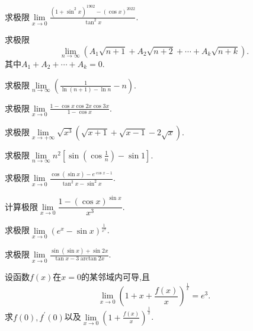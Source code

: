 \documentclass[UTF8,a4paper]{ctexart}
\begin{document}
\begin{example}[西北大学,2023]
	求极限$\lim\limits_{x\to 0}\frac{(1+\sin^2 x)^{1902}-(\cos x)^{2022}}{\tan^2 x}$.
\end{example}
\begin{example}[华南师范大学,2023]
	求极限
	\begin{equation*}
		\lim\limits_{n\to\infty}\left(A_1\sqrt{n+1}+A_2\sqrt{n+2}+\cdots+A_k\sqrt{n+k}\right).
	\end{equation*}
其中$A_1+A_2+\cdots+A_k=0$.
\end{example}
\newpage
\begin{thinking}[四川大学,2023]
	求极限$\lim\limits_{n\to\infty}\left (\frac{1}{\ln \left (n+1\right )-\ln n}-n\right )$.
\end{thinking}
\begin{thinking}[西南交通大学,2023]
	求极限$\lim\limits_{x\to 0}\frac{1-\cos x\cos 2x\cos 3x}{1-\cos x}$.
\end{thinking}
\begin{thinking}[华中师范大学,2023]
	求极限$\lim\limits_{x\to +\infty}\sqrt{x^3}\left (\sqrt{x+1}+\sqrt{x-1}-2\sqrt{x}\right )$.
\end{thinking}
\newpage
\begin{example}[吉林大学,2023]
	求极限$\lim\limits_{n\to\infty}n^2\left [\sin \left (\cos \frac1n\right )-\sin 1\right ]$.
\end{example}
\begin{example}[南开大学,2023]
	求极限$\lim\limits_{x\to 0}\frac{\cos \left (\sin x\right )-e^{\cos x-1}}{\tan ^2x-\sin ^2x}$.
\end{example}
\newpage
\begin{thinking}[长安大学,2023]
	计算极限$ \lim\limits_{x\to 0}\dfrac{1-\left (\cos x\right )^{\sin x}}{x^3} $.
\end{thinking}
\begin{thinking}[南京师范大学,2023]
求极限$ \lim\limits_{x\to 0}\left (e^x-\sin x\right )^{\frac{1}{x^2}} $.
\end{thinking}
\begin{thinking}[西南大学,2023]
	求极限$ \lim\limits_{x\to 0}\frac{\sin \left (\sin x\right )+\sin 2x}{\tan x-3\arctan 2x} $.
\end{thinking}
\newpage
\begin{example}[重庆大学,2023]
	设函数$ f(x) $在$ x=0 $的某邻域内可导,且
	\[
	 \lim\limits_{x\to 0}\left (1+x+\frac{f(x)}{x}\right )^{\frac{1}{x}}=e^{3} .
	 \]
求$ f(0),f^{\prime}(0) $以及$ \lim\limits_{x\to 0}\left (1+\frac{f(x)}{x}\right )^{\frac1x} $.
\end{example}
\end{document}
